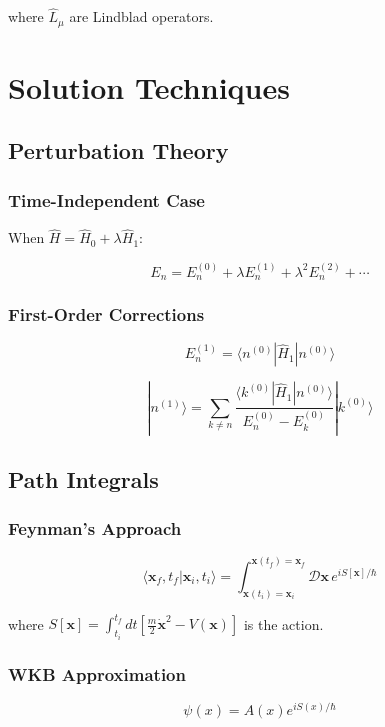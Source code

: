 \documentclass[12pt,oneside]{book}
\begin{document}
where $\hat{L}_\mu$ are Lindblad operators.

\part{Solution Techniques}

\chapter{Perturbation Theory}

\section{Time-Independent Case}

When $\hat{H} = \hat{H}_0 + \lambda\hat{H}_1$:

$$E_n = E_n^{(0)} + \lambda E_n^{(1)} + \lambda^2 E_n^{(2)} + \cdots$$

\section{First-Order Corrections}

$$E_n^{(1)} = \langle n^{(0)}|\hat{H}_1|n^{(0)}\rangle$$

$$|n^{(1)}\rangle = \sum_{k \ne n} \frac{\langle k^{(0)}|\hat{H}_1|n^{(0)}\rangle}{E_n^{(0)} - E_k^{(0)}}|k^{(0)}\rangle$$

\chapter{Path Integrals}

\section{Feynman's Approach}

$$\langle\mathbf{x}_f, t_f | \mathbf{x}_i, t_i\rangle = \int_{\mathbf{x}(t_i)=\mathbf{x}_i}^{\mathbf{x}(t_f)=\mathbf{x}_f} \mathcal{D}\mathbf{x} \, e^{iS[\mathbf{x}]/\hbar}$$

where $S[\mathbf{x}] = \int_{t_i}^{t_f} dt \left[\frac{m}{2}\dot{\mathbf{x}}^2 - V(\mathbf{x})\right]$ is the action.

\section{WKB Approximation}

$$\psi(x) = A(x)e^{iS(x)/\hbar}$$
\end{document}
